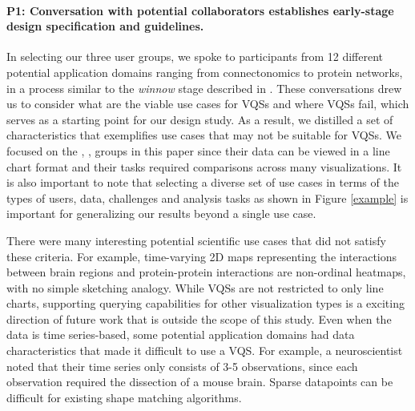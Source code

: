 {\paragraph{P1: Conversation with potential collaborators establishes early-stage design specification and guidelines.} 
\par In selecting our three user groups, we spoke to participants from 12 different potential application domains ranging from connectonomics to protein networks, in a process similar to the \textit{winnow} stage described in \cite{Sedlmair2012}. These conversations drew us to consider what are the viable use cases for VQSs and where VQSs fail, which serves as a starting point for our design study. As a result, we distilled a set of characteristics that exemplifies use cases that may not be suitable for VQSs. We focused on the \astro, \bio, \matsci groups in this paper since their data can be viewed in a line chart format and their tasks required comparisons across many visualizations. It is also important to note that selecting a diverse set of use cases in terms of the types of users, data, challenges and analysis tasks as shown in Figure \ref{example} is important for generalizing our results beyond a single use case.
\par There were many interesting potential scientific use cases that did not satisfy these criteria. For example, time-varying 2D maps representing the interactions between brain regions and protein-protein interactions are non-ordinal heatmaps, with no simple sketching analogy. While VQSs are not restricted to only line charts, supporting querying capabilities for other visualization types is a exciting direction of future work that is outside the scope of this study. Even when the data is time series-based, some potential application domains had data characteristics that made it difficult to use a VQS. For example, a neuroscientist noted that their time series only consists of 3-5  observations, since each observation required the dissection of a mouse brain. Sparse datapoints can be difficult for existing shape matching algorithms.  
}
